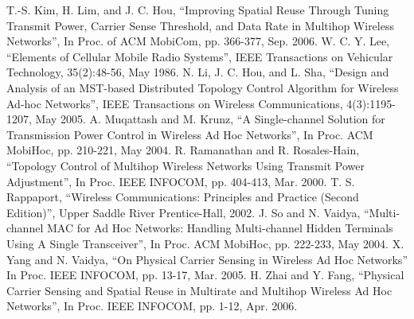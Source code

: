 \documentclass[12pt,a4paper]{article}
\begin{document}
\begin{thebibliography}{00}
 T.-S. Kim, H. Lim, and J. C. Hou, “Improving Spatial Reuse Through Tuning Transmit Power, Carrier Sense Threshold, and Data Rate in Multihop Wireless Networks”, In Proc. of ACM MobiCom, pp. 366-377, Sep. 2006.
 W. C. Y. Lee, “Elements of Cellular Mobile Radio Systems”, IEEE Transactions on Vehicular Technology, 35(2):48-56, May 1986.
 N. Li, J. C. Hou, and L. Sha, “Design and Analysis of an MST-based Distributed Topology Control Algorithm for Wireless Ad-hoc Networks”, IEEE Transactions on Wireless Communications, 4(3):1195-1207, May 2005.
 A. Muqattash and M. Krunz, “A Single-channel Solution for Transmission Power Control in Wireless Ad Hoc Networks”, In Proc. ACM MobiHoc, pp. 210-221, May 2004.
 R. Ramanathan and R. Rosales-Hain, “Topology Control of Multihop Wireless Networks Using Transmit Power Adjustment”, In Proc. IEEE INFOCOM, pp. 404-413,  Mar. 2000.
 T. S. Rappaport, “Wireless Communications: Principles and Practice (Second Edition)”, Upper Saddle River Prentice-Hall, 2002.
 J. So and N. Vaidya, “Multi-channel MAC for Ad Hoc Networks: Handling Multi-channel Hidden Terminals Using A Single Transceiver”, In Proc. ACM MobiHoc, pp. 222-233, May 2004.
 X. Yang and N. Vaidya, “On Physical Carrier Sensing in Wireless Ad Hoc Networks” In Proc. IEEE INFOCOM, pp. 13-17, Mar. 2005.
 H. Zhai and Y. Fang, “Physical Carrier Sensing and Spatial Reuse in Multirate and Multihop Wireless Ad Hoc Networks”, In Proc. IEEE INFOCOM, pp. 1-12, Apr. 2006.



\end{thebibliography}
\end{document}
